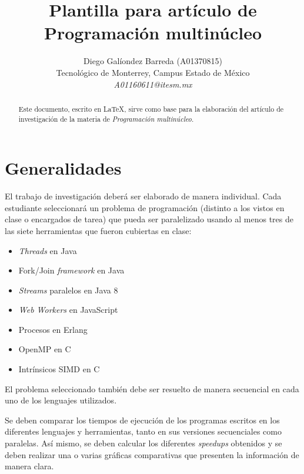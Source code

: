\documentclass[10pt,letterpaper,oneside]{article}
\begin{document}
\renewcommand\abstractname{Resumen}
\renewcommand\refname{Referencias}
\renewcommand{\notesname}{Notas}

\title{Plantilla para artículo de Programación multinúcleo}
\author{
\Large Diego Galíondez Barreda (A01370815)
\\
Tecnológico de Monterrey, Campus Estado de México
\\  
\Large \textit{A01160611@itesm.mx}}  

\maketitle

\begin{abstract}
Este documento, escrito en \LaTeX, sirve como base para la elaboración del artículo de investigación de la materia de \textit{Programación multinúcleo}. 
\end{abstract}

\section{Generalidades}

El trabajo de investigación deberá ser elaborado de manera individual. Cada estudiante seleccionará un problema de programación (distinto a los vistos en clase o encargados de tarea) que pueda ser paralelizado usando al menos tres de las siete herramientas que fueron cubiertas en clase:
    
\begin{itemize}
    \item \textit{Threads} en Java 
    \item Fork/Join \textit{framework} en Java
    \item \textit{Streams} paralelos en Java 8
    \item \textit{Web Workers} en JavaScript
    \item Procesos en Erlang    
    \item OpenMP en C       
    \item Intrínsicos SIMD en C
\end{itemize}

El problema seleccionado también debe ser resuelto de manera secuencial en cada uno de los lenguajes utilizados. 

Se deben comparar los tiempos de ejecución de los programas escritos en los diferentes lenguajes y herramientas, tanto en sus versiones secuenciales como paralelas. Así mismo, se deben calcular los diferentes \textit{speedups} obtenidos y se deben realizar una o varias gráficas comparativas que presenten la información de manera clara.   
\end{document}
